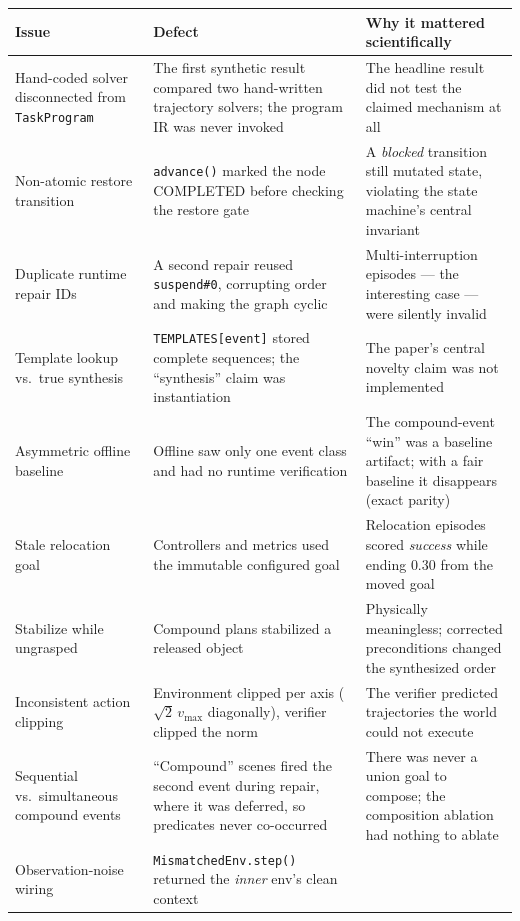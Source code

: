 \documentclass[11pt]{article}
\begin{document}
\begin{center}
\begin{longtable}{p{}p{}p{}}
\toprule
Issue & Defect & Why it mattered scientifically \\
\midrule
\endhead
Hand-coded solver disconnected from \texttt{TaskProgram}
 & The first synthetic result compared two hand-written trajectory solvers;
   the program IR was never invoked
 & The headline result did not test the claimed mechanism at all \\
Non-atomic restore transition
 & \texttt{advance()} marked the node \textsf{COMPLETED} before checking the
   restore gate
 & A \emph{blocked} transition still mutated state, violating the state machine's
   central invariant \\
Duplicate runtime repair IDs
 & A second repair reused \texttt{suspend\#0}, corrupting order and making the
   graph cyclic
 & Multi-interruption episodes --- the interesting case --- were silently invalid \\
Template lookup vs.\ true synthesis
 & \texttt{TEMPLATES[event]} stored complete sequences; the ``synthesis'' claim
   was instantiation
 & The paper's central novelty claim was not implemented \\
Asymmetric offline baseline
 & Offline saw only one event class and had no runtime verification
 & The compound-event ``win'' was a baseline artifact; with a fair baseline
   it disappears (exact parity) \\
Stale relocation goal
 & Controllers and metrics used the immutable configured goal
 & Relocation episodes scored \emph{success} while ending $0.30$ from the moved goal \\
\textsf{Stabilize} while ungrasped
 & Compound plans stabilized a released object
 & Physically meaningless; corrected preconditions changed the synthesized order \\
Inconsistent action clipping
 & Environment clipped per axis ($\sqrt2\,v_{\max}$ diagonally), verifier clipped
   the norm
 & The verifier predicted trajectories the world could not execute \\
Sequential vs.\ simultaneous compound events
 & ``Compound'' scenes fired the second event during repair, where it was
   deferred, so predicates never co-occurred
 & There was never a union goal to compose; the composition ablation had nothing
   to ablate \\
Observation-noise wiring
 & \texttt{MismatchedEnv.step()} returned the \emph{inner} env's clean context

\end{longtable}
\end{center}
\end{document}
